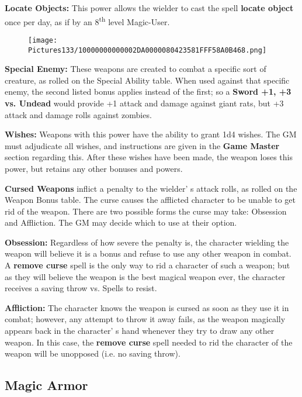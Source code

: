 \documentclass[a4paper,twoside,openany,10pt]{book}
\begin{document}
\begin{multicols}{2}
\textbf{Locate Objects:} This power allows the wielder to cast the spell \textbf{locate object} once per day, as if by an 8\textsuperscript{th} level Magic-User.

\begin{wrapfigure}{l}{0.25\textwidth}
	\texttt{[image: Pictures133/10000000000002DA0000080423581FFF58A0B468.png]}\medskip
\end{wrapfigure}

\textbf{Special Enemy:} These weapons are created to combat a specific sort of creature, as rolled on the Special Ability table. When used against that specific enemy, the second listed bonus applies instead of the first; so a \textbf{Sword +1, +3 vs. Undead} would provide +1 attack and damage against giant rats, but +3 attack and damage rolls against zombies.

\textbf{Wishes:} Weapons with this power have the ability to grant 1d4 wishes. The GM must adjudicate all wishes, and instructions are given in the \textbf{Game Master} section regarding this. After these wishes have been made, the weapon loses this power, but retains any other bonuses and powers.

\textbf{Cursed Weapons} inflict a penalty to the wielder' s attack rolls, as rolled on the Weapon Bonus table. The curse causes the afflicted character to be unable to get rid of the weapon. There are two possible forms the curse may take: Obsession and Affliction. The GM may decide which to use at their option. 

\textbf{Obsession:} Regardless of how severe the penalty is, the character wielding the weapon will believe it is a bonus and refuse to use any other weapon in combat. A \textbf{remove curse} spell is the only way to rid a character of such a weapon; but as they will believe the weapon is the best magical weapon ever, the character receives a saving throw vs. Spells to resist.

\textbf{Affliction: } The character knows the weapon is cursed as soon as they use it in combat; however, any attempt to throw it away fails, as the weapon magically appears back in the character' s hand whenever they try to draw any other weapon. In this case, the \textbf{remove curse} spell needed to rid the character of the weapon will be unopposed (i.e. no saving throw).


\subsection{Magic Armor}\label{magic-armor-1}


\end{multicols}
\end{document}
